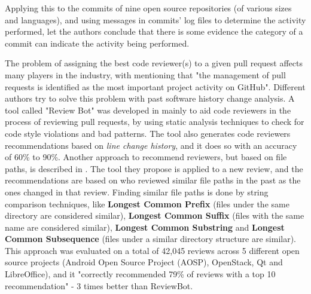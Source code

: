 Applying this to the commits of nine open source repositories (of various sizes and languages), and using messages in commits' log files to determine the activity performed, let the authors conclude that there is some evidence the category of a commit can indicate the activity being performed.

The problem of assigning the best code reviewer(s) to a given pull request affects many players in the industry, with \cite{Yu_2016} mentioning that "the management of pull requests is identified as the most important project activity on GitHub". Different authors try to solve this problem with past software history change analysis. A tool called "Review Bot" was developed in \cite{Balachandran_2013} mainly to aid code reviewers in the process of reviewing pull requests, by using static analysis techniques to check for code style violations and bad patterns. The tool also generates code reviewers recommendations based on \textit{line change history}, and it does so with an accuracy of 60\% to 90\%. Another approach to recommend reviewers, but based on file paths, is described in \cite{Thongtanunam_2015}. The tool they propose is applied to a new review, and the recommendations are based on who reviewed similar file paths in the past as the ones changed in that review. Finding similar file paths is done by string comparison techniques, like \textbf{Longest Common Prefix} (files under the same directory are considered similar), \textbf{Longest Common Suffix} (files with the same name are considered similar), \textbf{Longest Common Substring} and \textbf{Longest Common Subsequence} (files under a similar directory structure are similar). This approach was evaluated on a total of 42,045 reviews across 5 different open source projects (Android Open Source Project (AOSP), OpenStack, Qt and LibreOffice), and it "correctly
recommended 79\% of reviews with a top 10 recommendation" - 3 times better than ReviewBot.

